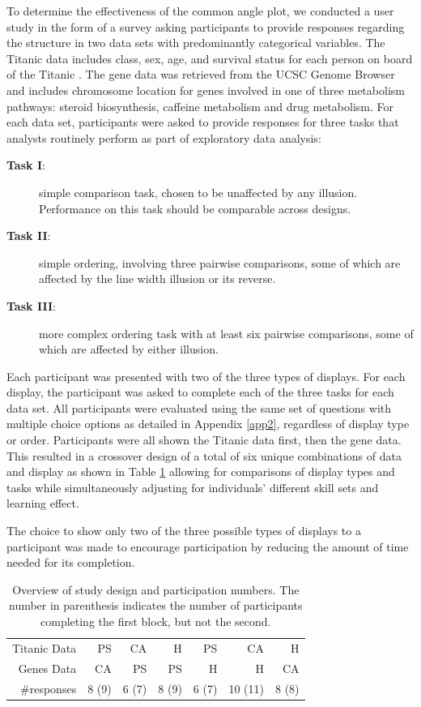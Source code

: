 \documentclass[journal]{vgtc}\usepackage{graphicx, color}
\begin{document}
To determine the effectiveness of the common angle plot, we conducted a user study in the form of a survey asking participants to provide responses regarding the structure in two data sets with predominantly categorical variables. The Titanic data  includes class, sex, age, and survival status for each person on board of the Titanic \citep{dawson:1995}. The gene data  was retrieved from the UCSC Genome Browser \citep{ucsc:2002} and includes chromosome location for genes involved in one of three metabolism pathways: steroid biosynthesis, caffeine metabolism and drug metabolism.
For each data set, participants were asked to provide responses for three tasks that analysts routinely perform as part of exploratory data analysis:
\begin{description}
\item[{\bf Task I}:] simple comparison task, chosen to be unaffected by any illusion. Performance on this task should be comparable across designs.
\item[{\bf Task II}:] simple ordering, involving three pairwise comparisons, some of which are affected by the line width illusion or its reverse. 

\item[{\bf Task III}:] more complex ordering task with at least six pairwise comparisons, some of which are affected by either illusion.
 \end{description}
 
Each participant was presented with two of the three types of displays. 
For each display, the participant was asked to complete each of the three tasks for each data set. All participants were evaluated using the same set of questions with multiple choice options as detailed in Appendix \ref{app2}, regardless of display type or order. Participants were all shown the Titanic data first, then the gene data.  %
This resulted in a crossover design of  a total of six unique combinations of data and display as shown in Table \ref{tab:designs} allowing for comparisons of display types and tasks while  simultaneously adjusting for individuals' different skill sets and learning effect.

The choice to show only two of the three possible types of displays to a participant was made to encourage  participation by reducing the amount of time needed for its completion. 


\begin{table}[htbp]
\centering
\begin{tabular}{rrrrrrr}
Titanic Data & PS & CA & H & PS & CA & H \\ 
Genes Data & CA & PS & PS & H& H & CA \\ \hline
\#responses &  8 (9) &  6 (7) &  8 (9) &  6 (7) & 10 (11) & 8 (8)\\ 
\end{tabular}
\caption{\label{tab:designs} Overview of study design and participation numbers. The number in parenthesis indicates the number of participants completing the first block, but not the second.}
\end{table}
\end{document}
